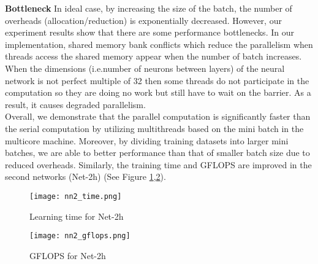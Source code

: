 \textbf{Bottleneck} In ideal case, by increasing the size of the batch, the number of overheads (allocation/reduction) is exponentially decreased. However, our experiment results show that there are some performance bottlenecks. In our implementation, shared memory bank conflicts which reduce the parallelism when threads access the shared memory appear when the number of batch increases. When the dimensions (i.e.number of neurons between layers) of the neural network is not perfect multiple of 32 then some threads do not participate in the computation so they are doing no work but still have to wait on the barrier. As a result, it causes degraded parallelism.\\

Overall, we demonstrate that the parallel computation is significantly faster than the serial computation by utilizing multithreads based on the mini batch in the multicore machine. Moreover, by dividing training datasets into larger mini batches, we are able to better performance than that of smaller batch size due to reduced overheads. Similarly, the training time and GFLOPS are improved in the second networks (Net-2h) (See Figure \ref{fig:nn2_time},\ref{fig:nn2_gflops}). 
\begin{figure}[ht]
\begin{center}
\centerline{\texttt{[image: nn2\_time.png]}}
\caption{Learning time for Net-2h}
\label{fig:nn2_time}
\end{center}
\vskip -0.4in
\end{figure}
\begin{figure}[ht]
\vskip 0.2in
\begin{center}
\centerline{\texttt{[image: nn2\_gflops.png]}}
\caption{GFLOPS for Net-2h}
\label{fig:nn2_gflops}
\end{center}
\vskip -0.4in
\end{figure}



